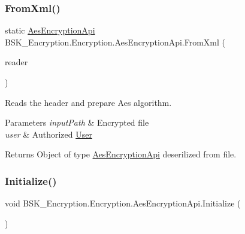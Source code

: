 \subsubsection{\texorpdfstring{From\+Xml()}{FromXml()}}
{\footnotesize\ttfamily static \mbox{\hyperlink{class_b_s_k___encryption_1_1_encryption_1_1_aes_encryption_api}{Aes\+Encryption\+Api}} B\+S\+K\+\_\+\+Encryption.\+Encryption.\+Aes\+Encryption\+Api.\+From\+Xml (\begin{DoxyParamCaption}\item[{Xml\+Reader}]{reader }\end{DoxyParamCaption})\hspace{0.3cm}{\ttfamily [static]}}



Reads the header and prepare Aes algorithm. 


\begin{DoxyParams}{Parameters}
{\em input\+Path} & Encrypted file\\
\hline
{\em user} & Authorized \mbox{\hyperlink{class_b_s_k___encryption_1_1_encryption_1_1_user}{User}}\\
\hline
\end{DoxyParams}
\begin{DoxyReturn}{Returns}
Object of type {\ttfamily \mbox{\hyperlink{class_b_s_k___encryption_1_1_encryption_1_1_aes_encryption_api}{Aes\+Encryption\+Api}}} deserilized from file.
\end{DoxyReturn}
\mbox{\label{class_b_s_k___encryption_1_1_encryption_1_1_aes_encryption_api_a89804f5db642dc4abe751635f1af8df7}} 
\subsubsection{\texorpdfstring{Initialize()}{Initialize()}}
{\footnotesize\ttfamily void B\+S\+K\+\_\+\+Encryption.\+Encryption.\+Aes\+Encryption\+Api.\+Initialize (\begin{DoxyParamCaption}{ }\end{DoxyParamCaption})}



